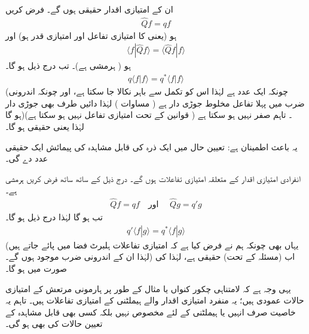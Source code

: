 ان کے امتیازی اقدار حقیقی ہوں گے۔ 
 فرض کریں
\begin{align*}
\hat{Q}f = qf 
\end{align*}
ہو (یعنی  کا امتیازی تفاعل  اور امتیازی قدر  ہو) اور 
\begin{align*}
\langle f | \hat{Q} f \rangle = \langle \hat{Q} f | f \rangle
\end{align*}
ہو ( ہرمشی ہے)۔ تب درج ذیل ہو گا۔
\begin{align*}
q\langle f \left\vert f \right. \rangle = q^{*} \langle f \left\vert f \right. \rangle
\end{align*}
(چونکہ  ایک عدد ہے لہٰذا اس کو تکمل سے باہر نکالا جا سکتا ہے، اور چونکہ اندرونی ضرب میں پہلا تفاعل مخلوط جوڑی دار ہے ( مساوات  ) لہٰذا دائیں طرف  بھی جوڑی دار ہو گا)۔ تاہم  صفر نہیں ہو سکتا ہے ( قوانین کے تحت  امتیازی تفاعل نہیں ہو سکتا ہے) لہٰذا  یعنی  حقیقی ہو گا۔

 یہ باعث اطمینان ہے: تعیین حال میں ایک ذرہ کی قابل مشاہدہ کی پیمائش ایک حقیقی عدد دے گی۔ 
 
انفرادی امتیازی اقدار کے متعلقہ امتیازی تفاعلات  ہوں گے۔ 
درج ذیل کے ساتھ ساتھ فرض کریں  ہرمشی ہے۔
\begin{align*}
\hat{Q}f = qf \quad \text{اور }\quad \hat{Q}g=q'g
\end{align*}
 تب  ہو گا لہٰذا درج ذیل ہو گا۔
\begin{align*}
q' \langle f | g \rangle = q^{*} \langle f | g \rangle
\end{align*}
(یہاں بھی چونکہ ہم نے فرض کیا ہے کہ امتیازی تفاعلات ہلبرٹ فضا میں پائے جاتے ہیں لہٰذا ان کے اندرونی ضرب موجود ہوں گے۔) اب (مسئلہ  کے تحت)  حقیقی ہے، لہٰذا  کی صورت میں  ہو گا۔ 

یہی وجہ ہے کہ لامتناہی چکور کنواں یا مثال کے طور پر ہارمونی مرتعش کے امتیازی حالات عمودی ہیں؛ یہ منفرد امتیازی اقدار والے ہیملٹنی کے امتیازی تفاعلات ہیں۔ تاہم یہ خاصیت صرف انہیں یا ہیملٹنی کے لئے مخصوص نہیں بلکہ کسی بھی قابل مشاہدہ کے تعیین حالات کی بھی ہو گی۔

